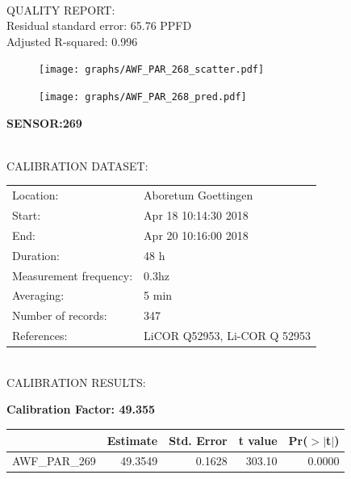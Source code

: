 \documentclass[oneside]{report}
\begin{document}
\hrulefill\\
QUALITY REPORT:\\
Residual standard error: 65.76 PPFD\\
Adjusted R-squared: 0.996



\begin{figure}[H]
  \centering
  \texttt{[image: graphs/AWF\_PAR\_268\_scatter.pdf]}
\end{figure}




\begin{figure}[H]
  \centering
  \texttt{[image: graphs/AWF\_PAR\_268\_pred.pdf]}
\end{figure}

\pagebreak


\begin{center}
\large{\textbf{SENSOR:269}}\\
\end{center}

\hrulefill\\
CALIBRATION DATASET:\\
\begin{table}[h!]
  \centering
  \label{tab:table1}
  \begin{tabular}{ll}
    Location: & Aboretum Goettingen\\ 
    
    
    Start:  & Apr 18 10:14:30 2018 \\
    End:   & Apr 20 10:16:00 2018\\ 
    Duration: & 48 h\\
    Measurement frequency: & 0.3hz\\
    Averaging:  &5 min\\
    Number of records: & 347 \\
    References: & LiCOR Q52953, Li-COR Q 52953 \\
  \end{tabular}
\end{table}

\hrulefill\\
CALIBRATION RESULTS:\\


\begin{center}
\textbf{\large{Calibration Factor: 49.355}}\\
\end{center}
\begin{table}[ht]
\centering
\begin{tabular}{rrrrr}
  \hline
 & Estimate & Std. Error & t value & Pr($>$$|$t$|$) \\ 
  \hline
AWF\_PAR\_269 & 49.3549 & 0.1628 & 303.10 & 0.0000 \\ 
   \hline
\end{tabular}
\end{table}
\end{document}
